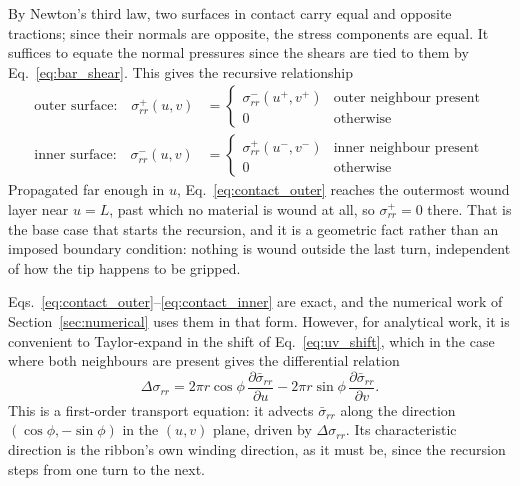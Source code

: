 \documentclass[11pt]{article}
\begin{document}
By Newton's third law, two surfaces in contact carry equal and opposite tractions; since their normals are opposite, the stress components are equal. It suffices to equate the normal pressures since the shears are tied to them by
Eq.~\eqref{eq:bar_shear}. This gives the recursive relationship
\begin{align}
    \text{outer surface:}\quad \sigma_{rr}^{+}(u,v) &=
      \begin{cases}
        \sigma_{rr}^{-}\left(u^{+}, v^{+}\right)
          & \text{outer neighbour present}\\
        0 & \text{otherwise}
      \end{cases}
      \label{eq:contact_outer}\\
    \text{inner surface:}\quad \sigma_{rr}^{-}(u,v) &=
      \begin{cases}
        \sigma_{rr}^{+}\left(u^{-}, v^{-}\right)
          & \text{inner neighbour present}\\
        0 & \text{otherwise}
      \end{cases}
      \label{eq:contact_inner}
\end{align}
Propagated far enough in $u$, Eq.~\eqref{eq:contact_outer} reaches the outermost
wound layer near $u = L$, past which no material is wound at all, so
$\sigma_{rr}^{+} = 0$ there. That is the base case that starts the recursion, and
it is a geometric fact rather than an imposed boundary condition: nothing is
wound outside the last turn, independent of how the tip happens to be gripped.

Eqs.~\eqref{eq:contact_outer}--\eqref{eq:contact_inner} are exact, and the
numerical work of Section~\ref{sec:numerical} uses them in that form. However, for analytical work, it is convenient to Taylor-expand in the shift of
Eq.~\eqref{eq:uv_shift}, which in the case where both neighbours are present
gives the differential relation
\begin{equation}\label{eq:transport}
    \boxed{\;\Delta\sigma_{rr} = 2\pi r\cos\phi\,
      \frac{\partial \bar\sigma_{rr}}{\partial u}
      - 2\pi r\sin\phi\,\frac{\partial \bar\sigma_{rr}}{\partial v}.\;}
\end{equation}
This is a first-order transport equation: it advects $\bar\sigma_{rr}$ along the direction
$\left(\cos\phi, -\sin\phi\right)$ in the $(u,v)$ plane, driven by
$\Delta\sigma_{rr}$. Its characteristic direction is the ribbon's own winding
direction, as it must be, since the recursion steps from one turn to the next.
\end{document}
